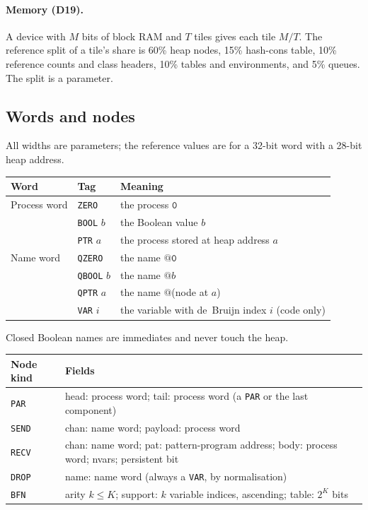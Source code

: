 \documentclass[10.5pt,a4paper]{extarticle}
\makeatletter
\newcommand{\kw}[1]{\texttt{#1}}
\newcommand{\nil}{\kw{0}}
\newcommand{\quo}[1]{@#1}
\newcommand{\dec}[1]{\textbf{D#1}}
\theoremstyle{definition}
\theoremstyle{remark}
\makeatother
\begin{document}
\paragraph{Memory (\dec{19}).} A device with $M$ bits of block RAM and $T$
tiles gives each tile $M/T$. The reference split of a tile's share is 60\%
heap nodes, 15\% hash-cons table, 10\% reference counts and class headers,
10\% tables and environments, and 5\% queues. The split is a parameter.

\subsection{Words and nodes}\label{sec:words}

All widths are parameters; the reference values are for a 32-bit word with a
28-bit heap address.

\medskip\noindent
\begin{tabularx}{\textwidth}{@{}l l X@{}}
\toprule
Word & Tag & Meaning\\
\midrule
Process word & \kw{ZERO} & the process $\nil$\\
             & \kw{BOOL} $b$ & the Boolean value $b$\\
             & \kw{PTR} $a$ & the process stored at heap address $a$\\
\addlinespace
Name word & \kw{QZERO} & the name $\quo{\nil}$\\
          & \kw{QBOOL} $b$ & the name $\quo{b}$\\
          & \kw{QPTR} $a$ & the name $\quo{}$(node at $a$)\\
          & \kw{VAR} $i$ & the variable with de~Bruijn index $i$ (code only)\\
\bottomrule
\end{tabularx}

\medskip\noindent
Closed Boolean names are immediates and never touch the heap.

\medskip\noindent
\begin{tabularx}{\textwidth}{@{}l X@{}}
\toprule
Node kind & Fields\\
\midrule
\kw{PAR}   & head: process word; tail: process word (a \kw{PAR} or the last component)\\
\kw{SEND}  & chan: name word; payload: process word\\
\kw{RECV}  & chan: name word; pat: pattern-program address; body: process
             word; nvars; persistent bit\\
\kw{DROP}  & name: name word (always a \kw{VAR}, by normalisation)\\
\kw{BFN}   & arity $k \le K$; support: $k$ variable indices, ascending;
             table: $2^K$ bits\\
\bottomrule
\end{tabularx}
\end{document}
